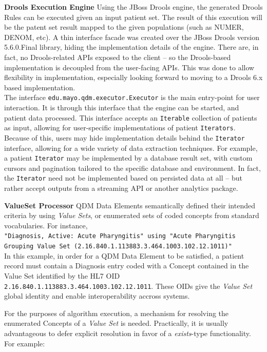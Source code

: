 \documentclass{amia}
\begin{document}
\textbf{Drools Execution Engine}
Using the JBoss Drools engine, the generated Drools Rules can be executed given an input patient set. The result of this execution will be the patent set result mapped to the given populations (such as NUMER, DENOM, etc). A thin interface facade was created over the JBoss Drools version 5.6.0.Final library, hiding the implementation details of the engine. There are, in fact, no Drools-related APIs exposed to the client -- so the Drools-based implementation is decoupled from the user-facing APIs. This was done to allow flexibility in implementation, especially looking forward to moving to a Drools 6.x based implementation.\\
The interface \texttt{edu.mayo.qdm.executor.Executor} is the main entry-point for user interaction. It is through this interface that the engine can be started, and patient data processed. This interface accepts an \texttt{Iterable} collection of patients as input, allowing for user-specific implementations of patient \texttt{Iterators}. Because of this, users may hide implementation details behind the \texttt{Iterator} interface, allowing for a wide variety of data extraction techniques. For example, a patient \texttt{Iterator} may be implemented by a database result set, with custom cursors and pagination tailored to the specific database and environment. In fact, the \texttt{Iterator} need not be implemented based on persisted data at all -- but rather accept outputs from a streaming API or another analytics package.

\textbf{ValueSet Processor}
QDM Data Elements semantically defined their intended criteria by using \textit{Value Sets}, or enumerated sets of coded concepts from standard vocabularies. For instance,\\

\texttt{"Diagnosis, Active: Acute Pharyngitis" using "Acute Pharyngitis Grouping Value Set (2.16.840.1.113883.3.464.1003.102.12.1011)"}\\

In this example, in order for a QDM Data Element to be satisfied, a patient record must contain a Diagnosis entry coded with a Concept contained in the Value Set identified by the HL7 OID \texttt{2.16.840.1.113883.3.464.1003.102.12.1011}. These OIDs give the \textit{Value Set} global identity and enable interoperability accross systems\cite{steindel2010oids}.

For the purposes of algorithm execution, a mechanism for resolving the enumerated Concepts of a \textit{Value Set} is needed. Practically, it is usually advantageous to defer explicit resolution in favor of a \textit{exists}-type functionality. For example:
\end{document}
